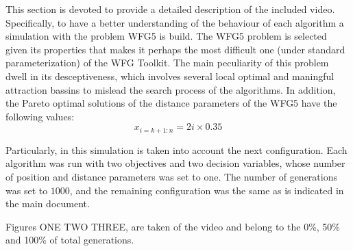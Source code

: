 This section is devoted to provide a detailed description of the included video.
%
Specifically, to have a better understanding of the behaviour of each algorithm a simulation with the problem WFG5 is build.
%
The WFG5 problem is selected given its properties that makes it perhaps the most difficult one (under standard parameterization) of the WFG Toolkit.
%
The main peculiarity of this problem dwell in its desceptiveness, which involves several local optimal and maningful attraction bassins to mislead the search process of the algorithms.
%
In addition, the Pareto optimal solutions of the distance parameters of the WFG5 have the following values:
%
\begin{equation}
   x_{i=k+1:n} = 2i \times 0.35
\end{equation}

Particularly, in this simulation is taken into account the next configuration.
%
Each algorithm was run with two objectives and two decision variables, whose number of position and distance parameters was set to one.
%
The number of generations was set to $1000$, and the remaining configuration was the same as is indicated in the main document.
%

Figures ONE TWO THREE, are taken of the video and belong to the 0\%, 50\% and 100\% of total generations.


